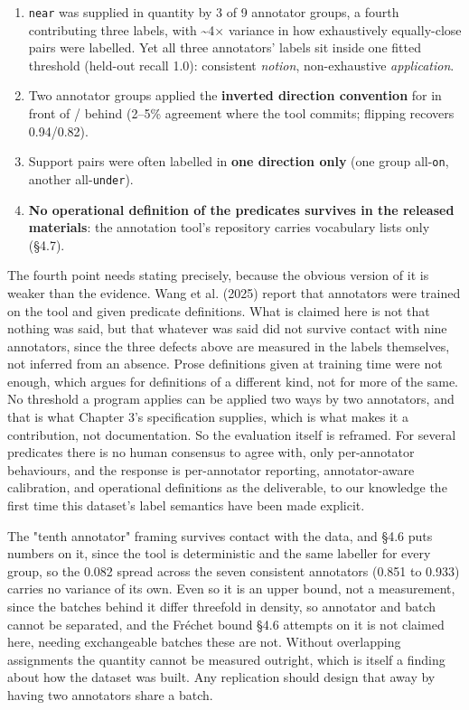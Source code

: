 \begin{enumerate}
\item \texttt{near} was supplied in quantity by 3 of 9 annotator groups, a fourth contributing three labels, with \textasciitilde{}4$\times$ variance in how exhaustively equally-close pairs were labelled. Yet all three annotators' labels sit inside one fitted threshold (held-out recall 1.0): consistent \textit{notion}, non-exhaustive \textit{application}.
\item Two annotator groups applied the \textbf{inverted direction convention} for in front of / behind (2--5\% agreement where the tool commits; flipping recovers 0.94/0.82).
\item Support pairs were often labelled in \textbf{one direction only} (one group all-\texttt{on}, another all-\texttt{under}).
\item \textbf{No operational definition of the predicates survives in the released materials}: the annotation tool's repository carries vocabulary lists only (\S{}4.7).
\end{enumerate}

The fourth point needs stating precisely, because the obvious version of it is weaker than the evidence. Wang et al. (2025) report that annotators were trained on the tool and given predicate definitions. What is claimed here is not that nothing was said, but that whatever was said did not survive contact with nine annotators, since the three defects above are measured in the labels themselves, not inferred from an absence. Prose definitions given at training time were not enough, which argues for definitions of a different kind, not for more of the same. No threshold a program applies can be applied two ways by two annotators, and that is what Chapter 3's specification supplies, which is what makes it a contribution, not documentation. So the evaluation itself is reframed. For several predicates there is no human consensus to agree with, only per-annotator behaviours, and the response is per-annotator reporting, annotator-aware calibration, and operational definitions as the deliverable, to our knowledge the first time this dataset's label semantics have been made explicit.

The "tenth annotator" framing survives contact with the data, and \S{}4.6 puts numbers on it, since the tool is deterministic and the same labeller for every group, so the 0.082 spread across the seven consistent annotators (0.851 to 0.933) carries no variance of its own. Even so it is an upper bound, not a measurement, since the batches behind it differ threefold in density, so annotator and batch cannot be separated, and the Fréchet bound \S{}4.6 attempts on it is not claimed here, needing exchangeable batches these are not. Without overlapping assignments the quantity cannot be measured outright, which is itself a finding about how the dataset was built. Any replication should design that away by having two annotators share a batch.

